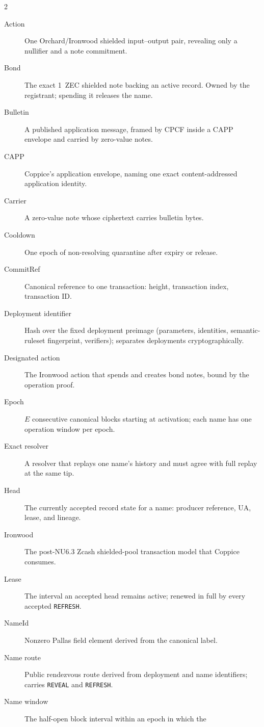 \documentclass[11pt]{article}
\newcommand{\operation}[1]{\texttt{#1}}
\begin{document}
\begin{multicols}{2}
\begin{description}
\item[Action] One Orchard/Ironwood shielded input--output pair, revealing
only a nullifier and a note commitment.
\item[Bond] The exact 1~ZEC shielded note backing an active record. Owned by
the registrant; spending it releases the name.
\item[Bulletin] A published application message, framed by CPCF inside a CAPP
envelope and carried by zero-value notes.
\item[CAPP] Coppice's application envelope, naming one exact content-addressed
application identity.
\item[Carrier] A zero-value note whose ciphertext carries bulletin bytes.
\item[Cooldown] One epoch of non-resolving quarantine after expiry or
release.
\item[\textsf{CommitRef}] Canonical reference to one transaction:
height, transaction index, transaction ID.
\item[Deployment identifier] Hash over the fixed deployment preimage
(parameters, identities, semantic-ruleset fingerprint, verifiers); separates
deployments cryptographically.
\item[Designated action] The Ironwood action that spends and creates bond
notes, bound by the operation proof.
\item[Epoch] $E$ consecutive canonical blocks starting at activation; each
name has one operation window per epoch.
\item[Exact resolver] A resolver that replays one name's history and must
agree with full replay at the same tip.
\item[Head] The currently accepted record state for a name: producer
reference, UA, lease, and lineage.
\item[Ironwood] The post-NU6.3 Zcash shielded-pool transaction model that
Coppice consumes.
\item[Lease] The interval an accepted head remains active; renewed in full by
every accepted \operation{REFRESH}.
\item[\textsf{NameId}] Nonzero Pallas field element derived from the
canonical label.
\item[Name route] Public rendezvous route derived from deployment and name
identifiers; carries \operation{REVEAL} and \operation{REFRESH}.
\item[Name window] The half-open block interval within an epoch in which the

\end{description}
\end{multicols}
\end{document}
